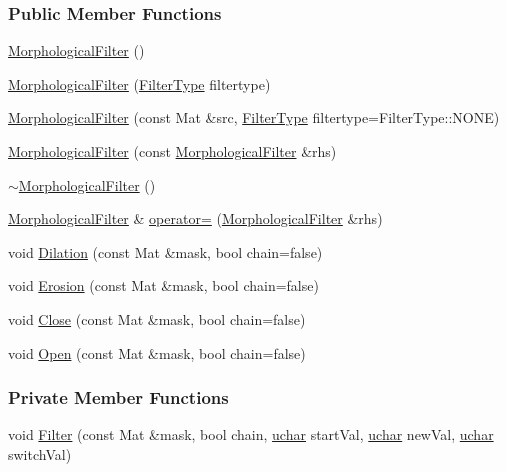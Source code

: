\subsubsection*{Public Member Functions}
\begin{DoxyCompactItemize}
\item 
\hyperlink{class_vision_1_1_morphological_filter_a86da6e12018a61c610942cee292a5b16}{Morphological\+Filter} ()
\item 
\hyperlink{class_vision_1_1_morphological_filter_adee61b49563bbab5c62699ce3b66f61d}{Morphological\+Filter} (\hyperlink{class_vision_1_1_morphological_filter_a1f19c9cb13f0d68778c77d6fd0370868}{Filter\+Type} filtertype)
\item 
\hyperlink{class_vision_1_1_morphological_filter_a629a6d6a08e47bad397dea88506ee18a}{Morphological\+Filter} (const Mat \&src, \hyperlink{class_vision_1_1_morphological_filter_a1f19c9cb13f0d68778c77d6fd0370868}{Filter\+Type} filtertype=Filter\+Type\+::\+N\+O\+N\+E)
\item 
\hyperlink{class_vision_1_1_morphological_filter_a097b3c98f3ae5d18caece09e76e4d466}{Morphological\+Filter} (const \hyperlink{class_vision_1_1_morphological_filter}{Morphological\+Filter} \&rhs)
\item 
\hyperlink{class_vision_1_1_morphological_filter_aa5d02af08a53911fb24d60d1a842e7cb}{$\sim$\+Morphological\+Filter} ()
\item 
\hyperlink{class_vision_1_1_morphological_filter}{Morphological\+Filter} \& \hyperlink{class_vision_1_1_morphological_filter_ac470002738b85326278c76538ba5a0b8}{operator=} (\hyperlink{class_vision_1_1_morphological_filter}{Morphological\+Filter} \&rhs)
\item 
void \hyperlink{class_vision_1_1_morphological_filter_abfba03324b8dd0280925463941345417}{Dilation} (const Mat \&mask, bool chain=false)
\item 
void \hyperlink{class_vision_1_1_morphological_filter_a62ad82519dc19be6367193a5d539c98b}{Erosion} (const Mat \&mask, bool chain=false)
\item 
void \hyperlink{class_vision_1_1_morphological_filter_ad18de4b3b27d7cd0465cd7f8c3d0b52f}{Close} (const Mat \&mask, bool chain=false)
\item 
void \hyperlink{class_vision_1_1_morphological_filter_a5e57dd85a3c583242b62c5669deab9a0}{Open} (const Mat \&mask, bool chain=false)
\end{DoxyCompactItemize}
\subsubsection*{Private Member Functions}
\begin{DoxyCompactItemize}
\item 
void \hyperlink{class_vision_1_1_morphological_filter_ab743062372a8d0b26dabfd27451e72ed}{Filter} (const Mat \&mask, bool chain, \hyperlink{_soil_math_types_8h_a65f85814a8290f9797005d3b28e7e5fc}{uchar} start\+Val, \hyperlink{_soil_math_types_8h_a65f85814a8290f9797005d3b28e7e5fc}{uchar} new\+Val, \hyperlink{_soil_math_types_8h_a65f85814a8290f9797005d3b28e7e5fc}{uchar} switch\+Val)
\end{DoxyCompactItemize}
